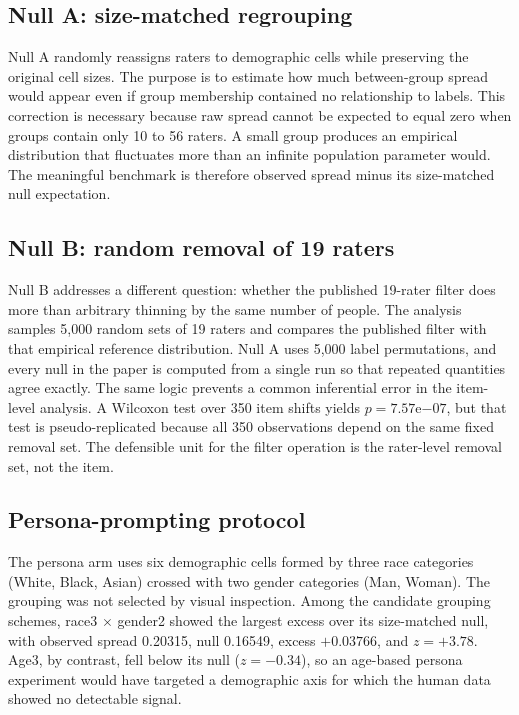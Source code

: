 \documentclass[11pt,a4paper]{article}
\begin{document}
\subsection{Null A: size-matched regrouping}

Null A randomly reassigns raters to demographic cells while preserving the original cell sizes.
The purpose is to estimate how much between-group spread would appear even if group membership
contained no relationship to labels. This correction is necessary because raw spread cannot be
expected to equal zero when groups contain only 10 to 56 raters. A small group produces an
empirical distribution that fluctuates more than an infinite population parameter would. The
meaningful benchmark is therefore observed spread minus its size-matched null expectation.

\subsection{Null B: random removal of 19 raters}

Null B addresses a different question: whether the published 19-rater filter does more than
arbitrary thinning by the same number of people. The analysis samples 5,000 random sets of 19 raters and compares the published filter with that
empirical reference distribution. Null A uses 5,000 label permutations, and every null in the
paper is computed from a single run so that repeated quantities agree exactly. The same logic prevents a common inferential error in
the item-level analysis. A Wilcoxon test over 350 item shifts yields $p = 7.57\mathrm{e}{-07}$,
but that test is pseudo-replicated because all 350 observations depend on the same fixed removal
set. The defensible unit for the filter operation is the rater-level removal set, not the item.

\subsection{Persona-prompting protocol}

The persona arm uses six demographic cells formed by three race categories (White, Black, Asian)
crossed with two gender categories (Man, Woman). The grouping was not selected by visual
inspection. Among the candidate grouping schemes, race3 $\times$ gender2 showed the largest
excess over its size-matched null, with observed spread 0.20315, null 0.16549, excess $+0.03766$,
and $z = +3.78$. Age3, by contrast, fell below its null ($z = -0.34$), so an age-based persona
experiment would have targeted a demographic axis for which the human data showed no detectable
signal.
\end{document}
